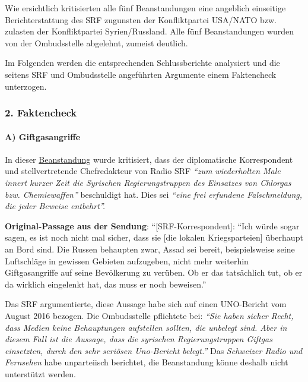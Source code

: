 Wie ersichtlich kritisierten alle fünf Beanstandungen eine angeblich
einseitige Berichterstattung des SRF zugunsten der Konfliktpartei
USA/NATO bzw. zulasten der Konfliktpartei Syrien/Russland. Alle fünf
Beanstandungen wurden von der Ombudsstelle abgelehnt, zumeist deutlich.

Im Folgenden werden die entsprechenden Schlussberichte analysiert und
die seitens SRF und Ombudsstelle angeführten Argumente einem Faktencheck
unterzogen.

\hypertarget{2-faktencheck}{%
\subsubsection{2. Faktencheck}\label{2-faktencheck}}

\hypertarget{a-giftgasangriffe}{%
\paragraph{A) Giftgasangriffe}\label{a-giftgasangriffe}}

In dieser
\href{https://www.srgd.ch/de/aktuelles/news/2016/09/28/sendung-info-3-auf-radio-srf-3-uber-waffenruhe-syrien-beanstandet/}{Beanstandung}
wurde kritisiert, dass der diplomatische Korrespondent und
stellvertretende Chefredakteur von Radio SRF \emph{``zum wiederholten
Male innert kurzer Zeit die Syrischen Regierungstruppen des Einsatzes
von Chlorgas bzw. Chemiewaffen''} beschuldigt hat. Dies sei \emph{``eine
frei erfundene Falschmeldung, die jeder Beweise entbehrt''.}

\textbf{Original-Passage aus der Sendung}: ``{[}SRF-Korrespondent{]}:
``Ich würde sogar sagen, es ist noch nicht mal sicher, dass sie {[}die
lokalen Kriegsparteien{]} überhaupt an Bord sind. Die Russen behaupten
zwar, Assad sei bereit, beispielsweise seine Luftschläge in gewissen
Gebieten aufzugeben, nicht mehr weiterhin Giftgasangriffe auf seine
Bevölkerung zu verüben. Ob er das tatsächlich tut, ob er da wirklich
eingelenkt hat, das muss er noch beweisen.''

Das SRF argumentierte, diese Aussage habe sich auf einen UNO-Bericht vom
August 2016 bezogen. Die Ombudsstelle pflichtete bei: \emph{``Sie haben
sicher Recht, dass Medien keine Behauptungen aufstellen sollten, die
unbelegt sind. Aber in diesem Fall ist die Aussage, dass die syrischen
Regierungstruppen Giftgas einsetzten, durch den sehr seriösen
Uno-Bericht belegt.''} Das \emph{Schweizer Radio und Fernsehen} habe
unparteiisch berichtet, die Beanstandung könne deshalb nicht unterstützt
werden.

